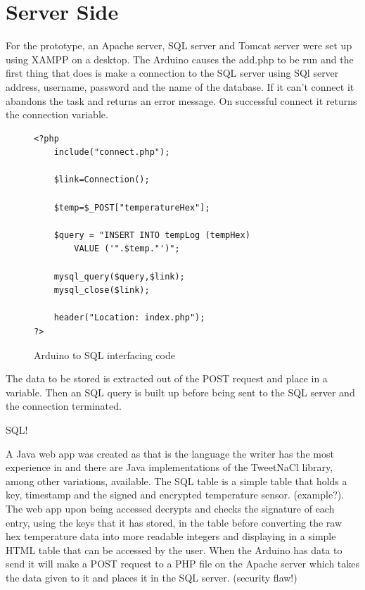 \section{Server Side}
For the prototype, an Apache server, SQL server and Tomcat server were set up using XAMPP on a desktop. The Arduino causes the add.php to be run and the first thing that does is make a connection to the SQL server using SQl server address, username, password and the name of the database. If it can't connect it abandons the task and returns an error message. On successful connect it returns the connection variable.

\begin{figure}[H]
\begin{lstlisting}[style=blah]
<?php
   	include("connect.php");
 
   	$link=Connection();
	
	$temp=$_POST["temperatureHex"];
 
	$query = "INSERT INTO tempLog (tempHex) 
		VALUE ('".$temp."')"; 
 
   	mysql_query($query,$link);
   	mysql_close($link);
 
   	header("Location: index.php");
?>
\end{lstlisting}
\caption{Arduino to SQL interfacing code}
\label{snip:php}
\end{figure}

The data to be stored is extracted out of the POST request and place in a variable. Then an SQL query is built up before being sent to the SQL server and the connection terminated.

SQL!

A Java web app was created as that is the language the writer has the most experience in and there are Java implementations of the TweetNaCl library, among other variations, available. The SQL table is a simple table that holds a key, timestamp and the signed and encrypted temperature sensor. (example?). The web app upon being accessed decrypts and checks the signature of each entry, using the keys that it has stored, in the table before converting the raw hex temperature data into more readable integers and displaying in a simple HTML table that can be accessed by the user. When the Arduino has data to send it will make a POST request to a PHP file on the Apache server which takes the data given to it and places it in the SQL server. (security flaw!)

